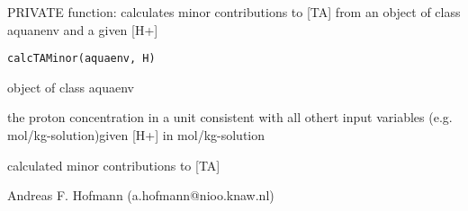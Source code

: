 \documentclass{article}
\begin{document}
\begin{Description}\relax
PRIVATE function: calculates minor contributions to [TA] from an object of class aquanenv and a given [H+]
\end{Description}
\begin{Usage}
\begin{verbatim}calcTAMinor(aquaenv, H)\end{verbatim}
\end{Usage}
\begin{Arguments}
\begin{ldescription}
\item[\code{aquaenv }] object of class aquaenv
\item[\code{H }] the proton concentration in a unit consistent with all othert input variables (e.g. mol/kg-solution)given [H+] in mol/kg-solution
\end{ldescription}
\end{Arguments}
\begin{Value}
calculated minor contributions to [TA]
\end{Value}
\begin{Author}\relax
Andreas F. Hofmann (a.hofmann@nioo.knaw.nl)
\end{Author}
\end{document}
